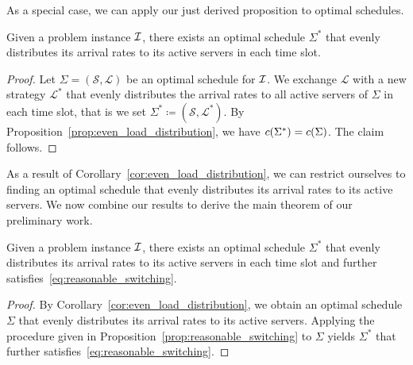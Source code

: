 As a special case, we can apply our just derived proposition to optimal schedules.
\begin{cor}\label{cor:even_load_distribution}
Given a problem instance $\mathcal{I}$, there exists an optimal schedule $\Sigma^*$ that evenly distributes its arrival rates to its active servers in each time slot.
\end{cor}
\begin{proof}
Let $\Sigma=(\mathcal{S},\mathcal{L})$ be an optimal schedule for $\mathcal{I}$. We exchange $\mathcal{L}$ with a new strategy $\mathcal{L}^*$ that evenly distributes the arrival rates to all active servers of $\Sigma$ in each time slot, that is we set $\Sigma^*\coloneqq(\mathcal{S},\mathcal{L}^*)$. By Proposition~\ref{prop:even_load_distribution}, we have $c(\Sigma^*)=c(\Sigma)$. The claim follows.
\end{proof}
As a result of Corollary~\ref{cor:even_load_distribution}, we can restrict ourselves to finding an optimal schedule that evenly distributes its arrival rates to its active servers. We now combine our results to derive the main theorem of our preliminary work.
\begin{thm}\label{thm:even_load_distribution_reasonable_switching}
Given a problem instance $\mathcal{I}$, there exists an optimal schedule $\Sigma^*$ that evenly distributes its arrival rates to its active servers in each time slot and further satisfies~\eqref{eq:reasonable_switching}.
\end{thm}
\begin{proof}
By Corollary~\ref{cor:even_load_distribution}, we obtain an optimal schedule $\Sigma$ that evenly distributes its arrival rates to its active servers. Applying the procedure given in Proposition~\ref{prop:reasonable_switching} to $\Sigma$ yields $\Sigma^*$ that further satisfies~\eqref{eq:reasonable_switching}.
\end{proof}

